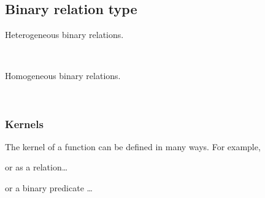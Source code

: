 \documentclass[a4paper,UKenglish,cleveref, autoref, thm-restate]{lipics-v2019}
\begin{document}
\subsection{Binary relation type}\label{binary-relation-type}
Heterogeneous binary relations.
\begin{code}%
\>[0]\AgdaSpace{}%
\AgdaSymbol{:}\AgdaSpace{}%
\AgdaSpace{}%
\AgdaSpace{}%
\AgdaSpace{}%
\AgdaSpace{}%
\AgdaSpace{}%
\AgdaSpace{}%
\AgdaSymbol{(}\AgdaSpace{}%
\AgdaSymbol{:}\AgdaSpace{}%
\AgdaSymbol{)}\AgdaSpace{}%
\AgdaSpace{}%
\AgdaSymbol{(}\AgdaSpace{}%
\AgdaSpace{}%
\AgdaSpace{}%
\AgdaSpace{}%
\AgdaSpace{}%
\AgdaSymbol{)}\AgdaSpace{}%
\<%
\\
\>[0]\AgdaSpace{}%
\AgdaSpace{}%
\AgdaSpace{}%
\AgdaSpace{}%
\AgdaSymbol{=}\AgdaSpace{}%
\AgdaSpace{}%
\AgdaSpace{}%
\AgdaSpace{}%
\AgdaSpace{}%
\AgdaSpace{}%
\<%
\end{code}

Homogeneous binary relations.
\begin{code}%
\>[0]\AgdaSpace{}%
\AgdaSymbol{:}\AgdaSpace{}%
\AgdaSpace{}%
\AgdaSpace{}%
\AgdaSpace{}%
\AgdaSymbol{(}\AgdaSpace{}%
\AgdaSymbol{:}\AgdaSpace{}%
\AgdaSymbol{)}\AgdaSpace{}%
\AgdaSpace{}%
\AgdaSpace{}%
\AgdaSpace{}%
\AgdaSpace{}%
\AgdaSpace{}%
\<%
\\
\>[0]\AgdaSpace{}%
\AgdaSpace{}%
\AgdaSpace{}%
\AgdaSymbol{=}\AgdaSpace{}%
\AgdaSpace{}%
\AgdaSpace{}%
\AgdaSpace{}%
\<%
\end{code}

\subsubsection{Kernels}\label{kernels}
The kernel of a function can be defined in many ways. For example,
\begin{code}  \end{code}
or as a relation\ldots{}
\begin{code}  \end{code}
or a binary predicate …
\begin{code}\end{code}
\end{document}
